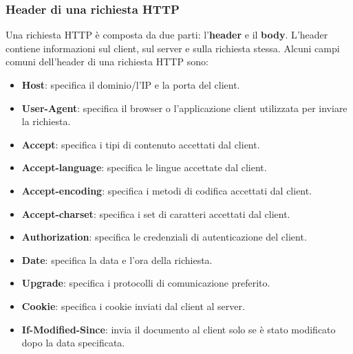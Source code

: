 \documentclass[12pt]{report}
\begin{document}
	\subsubsection{Header di una richiesta HTTP}
	Una richiesta HTTP è composta da due parti: l'\textbf{header} e il \textbf{body}. L'header contiene informazioni sul client, sul server e sulla richiesta stessa. Alcuni campi comuni dell'header di una richiesta HTTP sono:
	\begin{itemize}
		\item \textbf{Host}: specifica il dominio/l'IP e la porta del client.
		\item \textbf{User-Agent}: specifica il browser o l'applicazione client utilizzata per inviare la richiesta.
		\item \textbf{Accept}: specifica i tipi di contenuto accettati dal client.
		\item \textbf{Accept-language}: specifica le lingue accettate dal client.
		\item \textbf{Accept-encoding}: specifica i metodi di codifica accettati dal client.
		\item \textbf{Accept-charset}: specifica i set di caratteri accettati dal client.
		\item \textbf{Authorization}: specifica le credenziali di autenticazione del client.
		\item \textbf{Date}: specifica la data e l'ora della richiesta.
		\item \textbf{Upgrade}: specifica i protocolli di comunicazione preferito.
		\item \textbf{Cookie}: specifica i cookie inviati dal client al server.
		\item \textbf{If-Modified-Since}: invia il documento al client solo se è stato modificato dopo la data specificata.
	\end{itemize}
\end{document}
